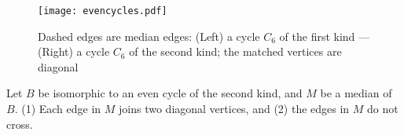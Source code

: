 \documentclass[10pt]{llncs}
\begin{document}
\begin{figure}{
  \begin{center}
    \texttt{[image: evencycles.pdf]}
  \caption{Dashed edges are median edges: (Left) a cycle $C_6$ of the
    first kind --- (Right) a cycle $C_6$ of the second kind; the
    matched vertices are diagonal}
       \label{cyckind}
  \end{center}
 }
\end{figure}




\begin{lemma} \label{2ndKind}
  Let $B$ be isomorphic to an even cycle of the second kind, and $M$
  be a median of $B$. (1) Each edge in $M$ joins two diagonal
  vertices, and (2) the edges in $M$ do not cross.
\end{lemma}
\end{document}
